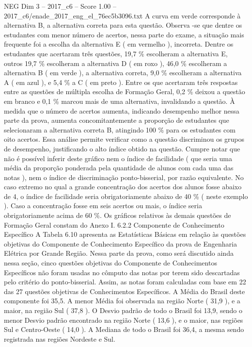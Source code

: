 \begin{textsample}{NEG Dim 3 – 2017\_c6 – Score 1.00 – 2017\_c6/enade\_2017\_eng\_el\_76ec5b3096.txt}
A curva em verde corresponde à alternativa B, a alternativa correta para esta questão.
Observa -se que dentre os estudantes com menor número de acertos, nessa parte do exame, a situação mais frequente foi a escolha da alternativa E ( em vermelho ), incorreta.
Dentre os estudantes que acertaram três questões, 19,7 \% escolheram a alternativa E, outros 19,7 \% escolheram a alternativa D ( em roxo ), 46,0 \% escolheram a alternativa B ( em verde ), a alternativa correta, 9,0 \% escolheram a alternativa A ( em azul ), e 5,4 \% a C ( em preto ).
Entre os que acertaram três respostas entre as questões de múltipla escolha de Formação Geral, 0,2 \% deixou a questão em branco e 0,1 \% marcou mais de uma alternativa, invalidando a questão.
À medida que o número de acertos aumenta, indicando desempenho melhor nessa parte da prova, aumenta concomitantemente a proporção de estudantes que selecionaram a alternativa correta B, atingindo 100 \% para os estudantes com oito acertos.
Essa análise permite verificar como a questão discriminou os grupos de desempenho, justificando o alto índice obtido na questão.
Cumpre notar que não é possível inferir deste gráfico nem o índice de facilidade ( que seria uma média da proporção ponderada pela quantidade de alunos com cada uma das notas ), nem o índice de discriminação ponto-bisserial, por razão equivalente.
No caso extremo no qual a grande concentração dos acertos dos alunos fosse abaixo de 4, o índice de facilidade seria obrigatoriamente abaixo de 40 \% ( neste exemplo ).
Caso a concentração fosse em seis acertos ou mais, o índice seria obrigatoriamente acima de 60 \%.
Os gráficos relativos às demais questões de Formação Geral constam do Anexo I. 6.2.2 Componente de Conhecimento Específico A Tabela 6.10 apresenta as Estatísticas Básicas em relação às questões objetivas do Componente de Conhecimento Específico da prova de Engenharia Elétrica por Grande Região.
Nessa parte da prova, como será discutido ainda nessa seção, cinco questões objetivas do Componente de Conhecimentos Específicos não foram usadas no cômputo das notas por terem sido descartadas pelo critério do ponto-bisserial.
Assim, as notas foram calculadas com base em 22 das 27 questões objetivas de Conhecimentos Específicos.
A Média do Brasil deste componente foi 35,5.
A menor Média foi observada na região Norte ( 31,9 ), e a maior, na região Sul ( 37,8 ).
O Desvio padrão de todo o Brasil foi 13,9, sendo o menor Desvio padrão encontrado na região Norte ( 13,6 ), e o maior, nas regiões Sul e Centro-Oeste ( 14,0 ).
A Mediana de todo o Brasil foi 36,4, a mesma sendo registrada nas regiões Nordeste e Sul.

\end{textsample}
